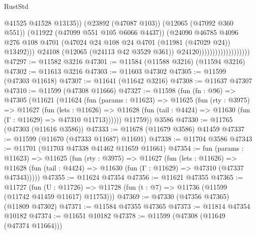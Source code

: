 \begin{lexlean}{RustStd}
\begin{coremodule}
                                                @41525
                                                @41528
                                                @13135))
                                            (@23892 (@47087 @103))
                                            (@12065 (@47092 @360 @551))
                                            (@11922 (@47099 @551 @105 @6066 @4437))
                                            (@24090
                                              @46785
                                              @4096
                                              @276
                                              @108
                                              @4701
                                              (@47024
                                                @24
                                                @108
                                                @24
                                                @4701
                                                (@11981 (@47029 @24))
                                                @13492)))
                                          @24108
                                          (@12065 (@24113 @42 @3529 @361))
                                          @24120)))))))))))))))))))
@47297 := @11582 @3216
@47301 := @11584 (@11588 @3216) (@11594 @3216)
@47302 := @11613 @3216
@47303 := @11603 @47302
@47305 := @11599 (@47303 @11618)
@47307 := @11641 (@11642 @3216)
@47308 := @11637 @47307
@47310 := @11599 (@47308 @11666)
@47327 := @11598
    (fun (fn : @96) =>
    @47305
      (@11621
        (@11624
          (fun (params : @11623) =>
          @11625
            (fun (rty : @3975) =>
            @11627
              (fun (lets : @11626) =>
              @11628 (fun (tail : @4424) => @11630 (fun (Γ : @11629) => @47310 @11713))))))
        @11759))
    @3586
@47330 := @11765 (@47303 (@11616 @3586))
@47333 := @11678 (@11679 @3586) @41459
@47337 := @11599 (@11670 (@47333 @11687) @11691)
@47338 := @11704 @3586
@47343 := @11701 (@11703 @47338 @41462 @11659 @11661)
@47354 := fun (params : @11623) =>
  @11625
    (fun (rty : @3975) =>
    @11627
      (fun (lets : @11626) =>
      @11628 (fun (tail : @4424) => @11630 (fun (Γ : @11629) => @47310 (@47337 @47343)))))
@47355 := @11624 @47354
@47356 := @11621 @47355
@47365 := @11727
    (fun (U : @11726) => @11728 (fun (t : @7) => @11736 (@11599 (@11742 @41459 @11617) @11753)))
@47369 := @47330 (@47356 @47365) (@11809 @47302)
@47371 := @11584 @47355 @47365
@47373 := @11814 @47354 @10182
@47374 := @11651 @10182
@47378 := @11599 (@47308 (@11649 (@47374 @11664)))

\end{coremodule}
\end{lexlean}
